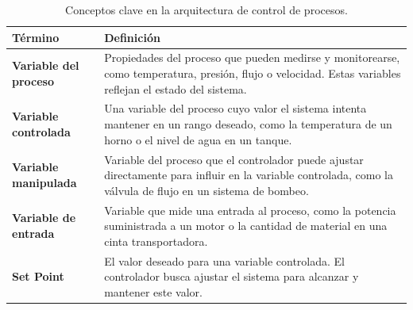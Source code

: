 \begin{table}[h!]
\label{tab:conceptosArq}
\caption{Conceptos clave en la arquitectura de control de procesos.}

\setlength{\extrarowheight}{5pt} %
\renewcommand{\arraystretch}{1.0} %
\begin{tabular}{|>{\raggedright\arraybackslash}p{4.5cm}|>{\raggedright\arraybackslash}p{10.5cm}|}
\hline
\textbf{Término}               & \textbf{Definición}                                                                                                                                       \\ \hline
\textbf{Variable del proceso}  & Propiedades del proceso que pueden medirse y monitorearse, como temperatura, presión, flujo o velocidad. Estas variables reflejan el estado del sistema. \\ \hline
\textbf{Variable controlada}   & Una variable del proceso cuyo valor el sistema intenta mantener en un rango deseado, como la temperatura de un horno o el nivel de agua en un tanque.    \\ \hline
\textbf{Variable manipulada}   & Variable del proceso que el controlador puede ajustar directamente para influir en la variable controlada, como la válvula de flujo en un sistema de bombeo. \\ \hline
\textbf{Variable de entrada}   & Variable que mide una entrada al proceso, como la potencia suministrada a un motor o la cantidad de material en una cinta transportadora.               \\ \hline
\textbf{Set Point}             & El valor deseado para una variable controlada. El controlador busca ajustar el sistema para alcanzar y mantener este valor.                              \\ \hline

\end{tabular}
\end{table}



